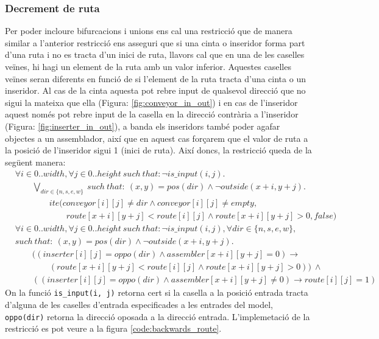 \subsubsection{Decrement de ruta}
Per poder incloure bifurcacions i unions ens cal una restricció que de manera similar a l'anterior restricció ens asseguri que si una cinta o inseridor forma part d'una ruta i no es tracta d'un inici de ruta, llavors cal que en una de les caselles veïnes, hi hagi un element de la ruta amb un valor inferior. Aquestes caselles veïnes seran diferents en funció de si l'element de la ruta tracta d'una cinta o un inseridor. Al cas de la cinta aquesta pot rebre input de qualsevol direcció que no sigui la mateixa que ella (Figura: \ref{fig:conveyor_in_out}) i en cas de l'inseridor aquest només pot rebre input de la casella en la direcció contrària a l'inseridor (Figura: \ref{fig:inserter_in_out}), a banda els inseridors també poder agafar objectes a un assemblador, així que en aquest cas forçarem que el valor de ruta a la posició de l'inseridor sigui 1 (inici de ruta).
Així doncs, la restricció queda de la següent manera:
\begin{align*}
    &\forall i \in 0..width, \forall j \in 0..height \ such \ that: \neg is\_input(i, j).\\
    &\qquad \bigvee_{dir \in \{n, s, e, w\}} \ such \ that: \ (x, y)=pos(dir) \land \neg outside(x+i, y+j).\\
    &\qquad \qquad ite\Big(conveyor[i][j]\neq dir\land conveyor[i][j]\neq empty,\\
    &\qquad \qquad \qquad route[x+i][y+j]<route[i][j]\land route[x+i][y+j]>0,false\Big)
\end{align*}
\begin{align*}
    &\forall i \in 0..width, \forall j \in 0..height \ such \ that: \neg is\_input(i,j), \forall dir \in \{n, s, e, w\},\\
    &such \ that: \ (x,y)=pos(dir) \land \neg outside(x+i,y+j).\\
    &\qquad ((inserter[i][j] = oppo(dir) \land assembler[x+i][y+j]=0) \rightarrow \\
    &\qquad \qquad (route[x+i][y+j]<route[i][j]\land route[x+i][y+j]>0)) \ \land \\
    &\qquad ((inserter[i][j] = oppo(dir) \land assembler[x+i][y+j]\neq0)\rightarrow route[i][j]=1)
\end{align*}
On la funció \lstinline{is_input(i, j)} retorna cert si la casella a la posició entrada tracta d'alguna de les caselles d'entrada especificades a les entrades del model, \lstinline{oppo(dir)} retorna la direcció oposada a la direcció entrada.
L'implemetació de la restricció es pot veure a la figura \ref{code:backwards_route}.


